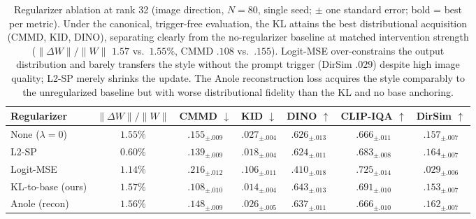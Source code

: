 \begin{table}[t]\centering\small
\setlength{\tabcolsep}{3.5pt}
\begin{tabular}{lcccccc}
\toprule
Regularizer & $\lVert\Delta W\rVert/\lVert W\rVert$ & CMMD $\downarrow$ & KID $\downarrow$ & DINO $\uparrow$ & CLIP-IQA $\uparrow$ & DirSim $\uparrow$ \\
\midrule
None ($\lambda{=}0$) & $1.55\%$ & $.155_{\pm.009}$ & $.027_{\pm.004}$ & $.626_{\pm.013}$ & $.666_{\pm.011}$ & $.157_{\pm.007}$ \\
L2-SP                & $0.60\%$ & $.139_{\pm.009}$ & $.018_{\pm.004}$ & $.624_{\pm.011}$ & $.683_{\pm.008}$ & $\mathbf{.164}_{\pm.007}$ \\
Logit-MSE            & $1.14\%$ & $.216_{\pm.012}$ & $.106_{\pm.011}$ & $.410_{\pm.018}$ & $\mathbf{.725}_{\pm.014}$ & $.029_{\pm.006}$ \\
KL-to-base (ours)    & $1.57\%$ & $\mathbf{.108}_{\pm.010}$ & $\mathbf{.014}_{\pm.004}$ & $\mathbf{.643}_{\pm.013}$ & $.691_{\pm.010}$ & $.153_{\pm.007}$ \\
Anole (recon)       & $1.56\%$ & $.148_{\pm.009}$ & $.026_{\pm.005}$ & $.637_{\pm.011}$ & $.666_{\pm.010}$ & $.162_{\pm.007}$ \\
\bottomrule
\end{tabular}
\caption{Regularizer ablation at rank 32 (image direction, $N{=}80$, single seed;
$\pm$ one standard error; bold = best per metric). Under the canonical,
trigger-free evaluation, the KL attains the best distributional acquisition
(CMMD, KID, DINO), separating clearly from the no-regularizer baseline at matched
intervention strength ($\lVert\Delta W\rVert/\lVert W\rVert$ $1.57$ vs.\ $1.55\%$,
CMMD $.108$ vs.\ $.155$). Logit-MSE over-constrains the output distribution and
barely transfers the style without the prompt trigger (DirSim $.029$) despite high
image quality; L2-SP merely shrinks the update. The Anole reconstruction loss
acquires the style comparably to the unregularized baseline but with worse
distributional fidelity than the KL and no base anchoring.}
\label{tab:reg-ablation}
\end{table}

\clearpage
